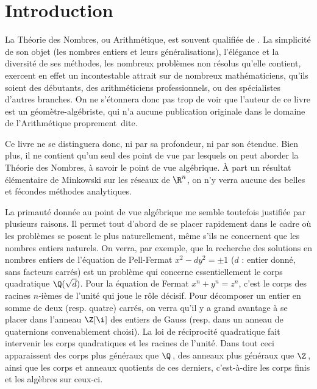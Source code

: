 \documentclass[11pt, useosf,
  title in boldface,
  theorem in new line,
  theorem numbering = section,
  number theorems separately,
]{simplivre}
\begin{document}
\frontmatter


\tableofcontents

\chapter{Introduction}

    La Théorie des Nombres, ou Arithmétique, est souvent qualifiée de . La simplicité de son objet (les nombres entiers et leurs généralisations), l'élégance et la diversité de ses méthodes, les nombreux problèmes non résolus qu'elle contient, exercent en effet un incontestable attrait sur de nombreux mathématiciens, qu'ils soient des débutants, des arithméticiens professionnels, ou des spécialistes d'autres branches. On ne s'étonnera donc pas trop de voir que l'auteur de ce livre est un géomètre-algébriste, qui n'a aucune publication originale dans le domaine de l'Arithmétique proprement~dite.

    Ce livre ne se distinguera donc, ni par sa profondeur, ni par son étendue. Bien plus, il ne contient qu'un seul des point de vue par lesquels on peut aborder la Théorie des Nombres, à savoir le point de vue algébrique. À part un résultat élémentaire de Minkowski sur les réseaux de \( \R^n \), on n'y verra aucune des belles et fécondes méthodes analytiques.

    La primauté donnée au point de vue algébrique me semble toutefois justifiée par plusieurs raisons. Il permet tout d'abord de se placer rapidement dans le cadre où les problèmes se posent le plus naturellement, même s'ils ne concernent que les nombres entiers naturels. On verra, par exemple, que la recherche des solutions en nombres entiers de l'équation de Pell-Fermat \( x^2 - d y^2 = \pm 1 \) (\( d \) : entier donné, sans facteurs carrés) est un problème qui concerne essentiellement le corps quadratique \( \Q(\sqrt{d}) \). Pour la  équation de Fermat \( x^n + y^n = z^n \), c'est le corps des racines \( n \)‑ièmes de l'unité qui joue le rôle décisif. Pour décomposer un entier en somme de deux (resp. quatre) carrés, on verra qu'il y a grand avantage à se placer dans l'anneau \( \Z[\i] \) des entiers de Gauss (resp. dans un anneau de quaternions convenablement choisi). La loi de réciprocité quadratique fait intervenir les corps quadratiques et les racines de l'unité. Dans tout ceci apparaissent des corps plus généraux que \( \Q \)\,, des anneaux plus généraux que \( \Z \)\,, ainsi que les corps et anneaux quotients de ces derniers, c'est-à-dire les corps finis et les algèbres sur ceux-ci.
\end{document}
